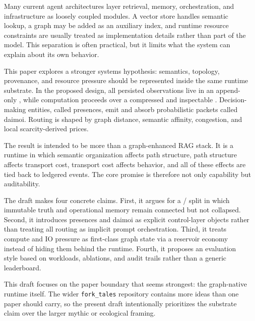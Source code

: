 Many current agent architectures layer retrieval, memory, orchestration, and infrastructure as loosely coupled modules. A vector store handles semantic lookup, a graph may be added as an auxiliary index, and runtime resource constraints are usually treated as implementation details rather than part of the model. This separation is often practical, but it limits what the system can explain about its own behavior.

This paper explores a stronger systems hypothesis: semantics, topology, provenance, and resource pressure should be represented inside the same runtime substrate. In the proposed design, all persisted observations live in an append-only \truthgraph{}, while computation proceeds over a compressed and inspectable \viewgraph{}. Decision-making entities, called presences, emit and absorb probabilistic packets called daimoi. Routing is shaped by graph distance, semantic affinity, congestion, and local scarcity-derived prices.

The result is intended to be more than a graph-enhanced RAG stack. It is a runtime in which semantic organization affects path structure, path structure affects transport cost, transport cost affects behavior, and all of these effects are tied back to ledgered events. The core promise is therefore not only capability but auditability.

The draft makes four concrete claims. First, it argues for a \truthgraph{}/\viewgraph{} split in which immutable truth and operational memory remain connected but not collapsed. Second, it introduces presences and daimoi as explicit control-layer objects rather than treating all routing as implicit prompt orchestration. Third, it treats compute and IO pressure as first-class graph state via a reservoir economy instead of hiding them behind the runtime. Fourth, it proposes an evaluation style based on workloads, ablations, and audit trails rather than a generic leaderboard.

This draft focuses on the paper boundary that seems strongest: the graph-native runtime itself. The wider \texttt{fork\_tales} repository contains more ideas than one paper should carry, so the present draft intentionally prioritizes the substrate claim over the larger mythic or ecological framing.
